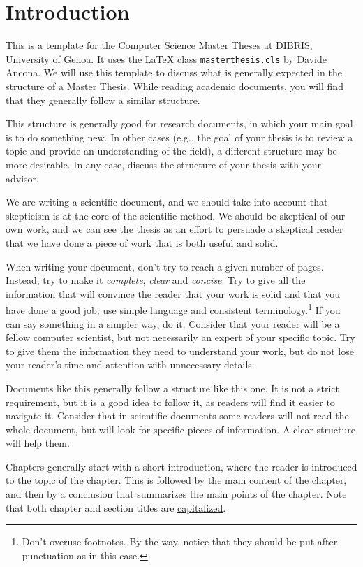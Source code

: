 \chapter{Introduction}
\label{sec:introduction}

This is a template for the Computer Science Master Theses at DIBRIS,
University of Genoa. It uses the \xspace{\LaTeX} class \texttt{masterthesis.cls} by
Davide Ancona. We will use this template to discuss what is generally expected in the
structure of a Master Thesis. While reading academic documents, you will find that
they generally follow a similar structure.

This structure is generally good for research documents, in which your main goal is to do
something new. In other cases (e.g., the goal of your thesis is to review a topic and provide
an understanding of the field), a different structure may be more desirable. In any case,
discuss the structure of your thesis with your advisor.

We are writing a scientific document, and we should take into account that skepticism
is at the core of the scientific method. We should be skeptical of our own work, and
we can see the thesis as an effort to persuade a skeptical reader that we have done
a piece of work that is both useful and solid.

When writing your document, don't try to reach a given number of pages. Instead, try to make it
\emph{complete}, \emph{clear} and \emph{concise}. Try to give all the information that will
convince the reader that your work is solid and that you have done a good job; use simple
language and consistent terminology.\footnote{Don't overuse footnotes. By the
way, notice that they should be put after punctuation as in this case.}
If you can say something in a simpler way, do it.
Consider that your reader will be a fellow computer scientist, but not necessarily an expert
of your specific topic. Try to give them the information they need to understand your work, but
do not lose your reader's time and attention with unnecessary details.

Documents like this generally follow a structure like this one. It is not a strict
requirement, but it is a good idea to follow it, as readers will find it easier to navigate it.
Consider that in scientific documents some readers will not read the whole document,
but will look for specific pieces of information. A clear structure will help them.

Chapters generally start with a short introduction, where the reader is introduced to the topic
of the chapter. This is followed by the main content of the chapter, and then by a conclusion
that summarizes the main points of the chapter. Note that both chapter and section titles are
\href{https://www.grammarly.com/blog/capitalization-in-the-titles/}{capitalized}.

